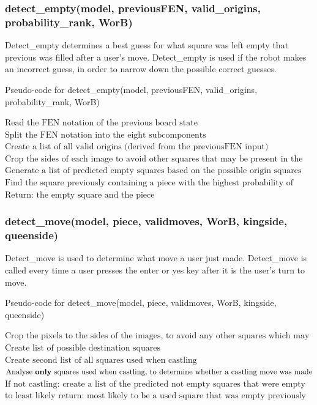 \documentclass[onecolumn]{IEEEtran}
\begin{document}
\subsubsection{detect\_empty(model, previousFEN, valid\_origins, probability\_rank, WorB)}
Detect\_empty determines a best guess for what square was left empty that previous was filled after a user's move. Detect\_empty is used if the robot makes an incorrect guess, in order to narrow down the possible correct guesses.

\begin{algorithm}[H]
\caption{Pseudo-code for detect\_empty(model, previousFEN, valid\_origins, probability\_rank, WorB)}
\begin{algorithmic}[1]
\STATE $\text{Read the FEN notation of the previous board state}$
\STATE $\text{Split the FEN notation into the eight subcomponents}$
\STATE $\text{Create a list of all valid origins (derived from the previousFEN input)}$
\STATE $\text{Crop the sides of each image to avoid other squares that may be present in the image}$
\STATE $\text{Generate a list of predicted empty squares based on the possible origin squares and analysis of the images}$
\STATE $\text{Find the square previously containing a piece with the highest probability of being empty after the user's move}$
\STATE $\text{Return: the empty square and the piece}$
\end{algorithmic}
\end{algorithm}

\subsubsection{detect\_move(model, piece, validmoves, WorB, kingside, queenside)}
Detect\_move is used to determine what move a user just made. Detect\_move is called every time a user presses the enter or yes key after it is the user's turn to move. 

\begin{algorithm}[H]
\caption{Pseudo-code for detect\_move(model, piece, validmoves, WorB, kingside, queenside)}
\begin{algorithmic}[1]
\STATE $\text{Crop the pixels to the sides of the images, to avoid any other squares which may be visible within the image}$
\STATE $\text{Create list of possible destination squares}$
\STATE $\text{Create second list of all squares used when castling}$
\STATE $\text{Analyse \textbf{only} squares used when castling, to determine whether a castling move was made}$
\STATE $\text{If not castling: create a list of the predicted not empty squares that were empty previously, in order of most}$
\STATEx $\text{to least likely}$
\STATE $\text{return: most likely to be a used square that was empty previously}$
\end{algorithmic}
\end{algorithm}
\end{document}
